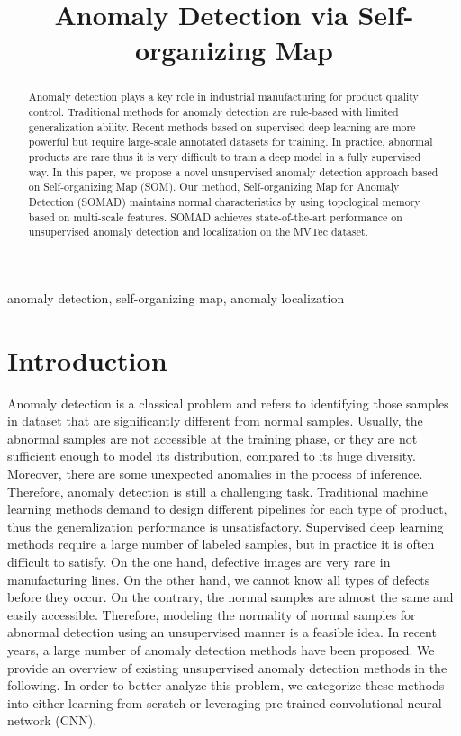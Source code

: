 \documentclass{article}
\title{Anomaly Detection via Self-organizing Map}
\begin{document}
\maketitle
\begin{abstract}
Anomaly detection plays a key role in industrial manufacturing for product quality control.
Traditional methods for anomaly detection are rule-based with limited generalization ability. 
Recent methods based on supervised deep learning are more powerful but require large-scale annotated datasets for training. 
In practice, abnormal products are rare thus it is very difficult to train a deep model in a fully supervised way.
In this paper, we propose a novel unsupervised anomaly detection approach based on Self-organizing Map (SOM). Our method, Self-organizing Map for Anomaly Detection (SOMAD) maintains normal characteristics by using topological memory based on multi-scale features. SOMAD achieves state-of-the-art performance on unsupervised anomaly detection and localization on the MVTec dataset.
\end{abstract}
\begin{keywords}
anomaly detection, self-organizing map, anomaly localization
\end{keywords}
\section{Introduction}
\label{sec:introduction}


Anomaly detection is a classical problem and refers to identifying those samples in dataset that are significantly different from normal samples.
Usually, the abnormal samples are not accessible at the training phase, or they are not sufficient enough to model its distribution, compared to its huge diversity. Moreover, there are some unexpected anomalies in the process of inference. Therefore, anomaly detection is still a challenging task.
Traditional machine learning methods demand to design different pipelines for each type of product, thus the generalization performance is unsatisfactory. Supervised deep learning methods require a large number of labeled samples, but in practice it is often difficult to satisfy. On the one hand, defective images are very rare in manufacturing lines. On the other hand, we cannot know all types of defects before they occur. On the contrary, the normal samples are almost the same and easily accessible. Therefore, modeling the normality of normal samples for abnormal detection using an unsupervised manner is a feasible idea. 
In recent years, a large number of anomaly detection methods have been proposed.
We provide an overview of existing unsupervised anomaly detection methods in the following. In order to better analyze this problem, we categorize these methods into either learning from scratch or leveraging pre-trained convolutional neural network (CNN).
\end{document}
